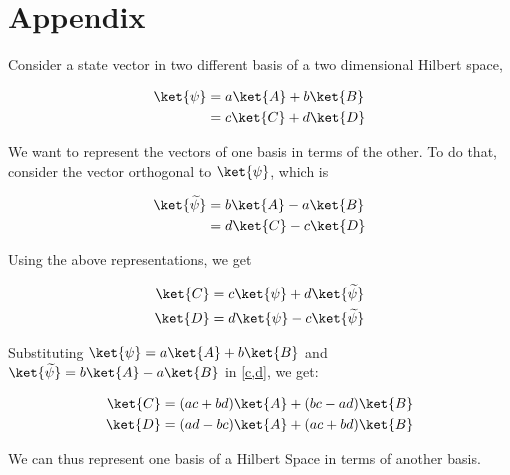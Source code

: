 \chapter{Appendix}
Consider a state vector in two different basis of a two dimensional Hilbert space,

\begin{align}
\ket{\psi} &= a\ket{A}+b\ket{B} \\ \nonumber 
		   &= c\ket{C}+d\ket{D}
\end{align}

We want to represent the vectors of one basis in terms of the other. To do that, consider the vector orthogonal to $\ket{\psi}$, which is 

\begin{align}
\ket{\widetilde{\psi}} &= b\ket{A}-a\ket{B} \\ \nonumber
						&= d\ket{C}-c\ket{D} 
\end{align}


Using the above representations, we get 

\begin{align}\label{c,d}
\ket {C} &= c\ket{\psi} + d\ket{\widetilde{\psi}} \\ \nonumber 
\ket {D} &= d\ket{\psi} - c\ket{\widetilde{\psi}}
\end{align}


Substituting $\ket{\psi} = a\ket{A}+b\ket{B}$ and $\ket{\widetilde{\psi}} = b\ket{A}-a\ket{B}$ in \ref{c,d}, we get:


\begin{align}
\ket {C} &= (ac+bd)\ket{A} + (bc-ad)\ket{B} \nonumber \\
\ket {D} &= (ad-bc)\ket{A} + (ac+bd)\ket{B}
\end{align}

We can thus represent one basis of a Hilbert Space in terms of another basis.